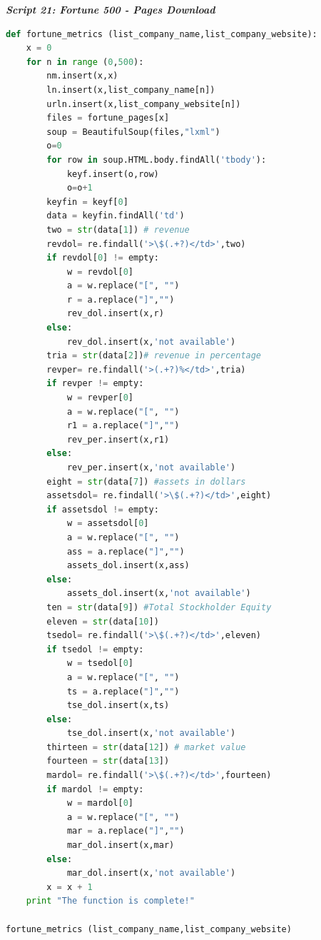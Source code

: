 \documentclass{book}
\begin{document}
\begin{center}
\textit{\textbf{Script 21: Fortune 500 - Pages Download}}\label{p21}
\end{center}
\begin{lstlisting}[language=Python]  
def fortune_metrics (list_company_name,list_company_website):
    x = 0
    for n in range (0,500):  
        nm.insert(x,x)
        ln.insert(x,list_company_name[n])
        urln.insert(x,list_company_website[n])
        files = fortune_pages[x]
        soup = BeautifulSoup(files,"lxml")
        o=0
        for row in soup.HTML.body.findAll('tbody'):
            keyf.insert(o,row)
            o=o+1
        keyfin = keyf[0] 
        data = keyfin.findAll('td')
        two = str(data[1]) # revenue 
        revdol= re.findall('>\$(.+?)</td>',two) 
        if revdol[0] != empty:
            w = revdol[0]
            a = w.replace("[", "")
            r = a.replace("]","")
            rev_dol.insert(x,r)
        else:
            rev_dol.insert(x,'not available')
        tria = str(data[2])# revenue in percentage
        revper= re.findall('>(.+?)%</td>',tria) 
        if revper != empty:    
            w = revper[0]
            a = w.replace("[", "")
            r1 = a.replace("]","")    
            rev_per.insert(x,r1) 
        else:
            rev_per.insert(x,'not available')
        eight = str(data[7]) #assets in dollars 
        assetsdol= re.findall('>\$(.+?)</td>',eight) 
        if assetsdol != empty:
            w = assetsdol[0]
            a = w.replace("[", "")
            ass = a.replace("]","")
            assets_dol.insert(x,ass)
        else:
            assets_dol.insert(x,'not available')
        ten = str(data[9]) #Total Stockholder Equity   
        eleven = str(data[10]) 
        tsedol= re.findall('>\$(.+?)</td>',eleven) 
        if tsedol != empty:
            w = tsedol[0]
            a = w.replace("[", "")
            ts = a.replace("]","")
            tse_dol.insert(x,ts)
        else:
            tse_dol.insert(x,'not available')
        thirteen = str(data[12]) # market value
        fourteen = str(data[13]) 
        mardol= re.findall('>\$(.+?)</td>',fourteen) 
        if mardol != empty:
            w = mardol[0]
            a = w.replace("[", "")
            mar = a.replace("]","")
            mar_dol.insert(x,mar)
        else:
            mar_dol.insert(x,'not available')
        x = x + 1
    print "The function is complete!"

fortune_metrics (list_company_name,list_company_website)
\end{lstlisting}
\end{document}
